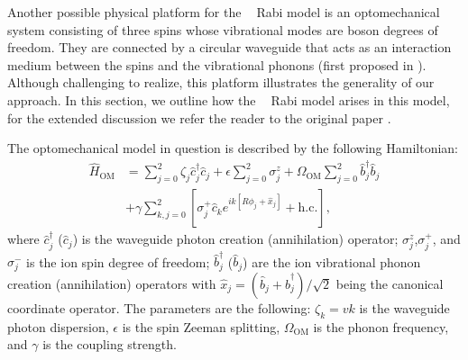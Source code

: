 \documentclass[reprint, aps, prx, amsmath, amssymb, longbibliography, superscriptaddress]{revtex4-2}
\DeclareMathOperator{\Zthree}{\mathbb{Z}_3}
\begin{document}
Another possible physical platform for the $\Zthree$ Rabi model is an optomechanical system consisting of three spins whose vibrational modes are boson degrees of freedom. They are connected by a circular waveguide that acts as an interaction medium between the spins and the vibrational phonons (first proposed in \cite{sedov_chiral_2020}). Although challenging to realize, this platform illustrates the generality of our approach. In this section, we outline how the $\Zthree$ Rabi model arises in this model, for the extended discussion we refer the reader to the original paper \cite{sedov_chiral_2020}. 

The optomechanical model in question is described by the following Hamiltonian:
\begin{equation}
\label{eq:optomechanical-qb-ring}
\begin{aligned}
    \hat{H}_{\text{OM}}&=\sum\limits_{j=0}^2 \zeta_j \hat{c}_j^{\dagger} \hat{c}_j + 
 \epsilon \sum_{j=0}^2 \sigma_j^z + \Omega_{\text{OM}} \sum_{j=0}^2 \hat{b}_j^{\dagger} \hat{b}_j \\
    &+\gamma \sum_{k, j=0}^2 \left[\sigma_j^{+} \hat{c}_k e^{i k\left[R \phi_j+\hat x_j\right]}+\text {h.c.}\right] \text {, }
\end{aligned}   
\end{equation}
where $\hat c_j^\dagger$ ($\hat c_j$) is the waveguide photon creation (annihilation) operator; $\sigma^z_j$,$\sigma_j^+$, and $\sigma_j^-$ is the ion spin degree of freedom; $\hat b^{\dagger}_j$ ($\hat b_j$) are the ion vibrational phonon creation (annihilation) operators with $\hat x_j = (\hat b_j + \hat b_j^{\dagger})/\sqrt{2}$ being the canonical coordinate operator. The parameters are the following: 
$\zeta_k = v k$ is the waveguide photon dispersion, $\epsilon$ is the spin Zeeman splitting, $\Omega_{\text{OM}}$ is the phonon frequency, and $\gamma$ is the coupling strength.
\end{document}
